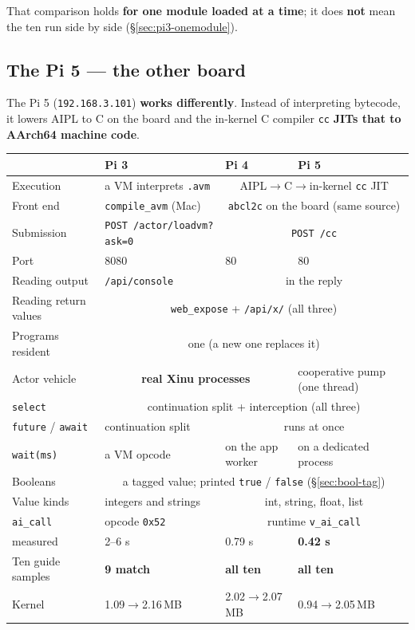 \documentclass[11pt,a4paper]{article}
\begin{document}
That comparison holds \textbf{for one module loaded at a time}; it does
\textbf{not} mean the ten run side by side (\S\ref{sec:pi3-onemodule}).

\subsection{The Pi 5 --- the other board}
\label{sec:xinu-pi5}

The Pi 5 (\texttt{192.168.3.101}) \textbf{works differently}. Instead of
interpreting bytecode, it lowers AIPL to C on the board and the in-kernel C
compiler \texttt{cc} \textbf{JITs that to AArch64 machine code}.

\begin{center}
\small
\begin{tabular}{@{}llll@{}}
\toprule
 & Pi 3 & Pi 4 & Pi 5 \\
\midrule
Execution & a VM interprets \texttt{.avm} & \multicolumn{2}{c}{AIPL$\to$C$\to$in-kernel \texttt{cc} JIT} \\
Front end & \texttt{compile\_avm} (Mac) & \multicolumn{2}{c}{\texttt{abcl2c} on the board (same source)} \\
Submission & \texttt{POST /actor/loadvm?ask=0} & \multicolumn{2}{c}{\texttt{POST /cc}} \\
Port & 8080 & 80 & 80 \\
Reading output & \texttt{/api/console} & \multicolumn{2}{c}{in the reply} \\
Reading return values & \multicolumn{3}{c}{\texttt{web\_expose} + \texttt{/api/x/} (all three)} \\
Programs resident & \multicolumn{3}{c}{one (a new one replaces it)} \\
Actor vehicle & \multicolumn{2}{c}{\textbf{real Xinu processes}} & cooperative pump (one thread) \\
\texttt{select} & \multicolumn{3}{c}{continuation split + interception (all three)} \\
\texttt{future} / \texttt{await} & continuation split & \multicolumn{2}{c}{runs at once} \quad (none concurrent) \\
\texttt{wait(ms)} & a VM opcode & on the app worker & on a dedicated process \\
Booleans & \multicolumn{3}{c}{a tagged value; printed \texttt{true} / \texttt{false} (\S\ref{sec:bool-tag})} \\
Value kinds & integers and strings & \multicolumn{2}{c}{int, string, float, list} \\
\texttt{ai\_call} & opcode \texttt{0x52} & \multicolumn{2}{c}{runtime \texttt{v\_ai\_call}} \\
\quad measured & 2--6 s & 0.79 s & \textbf{0.42 s} \\
Ten guide samples & \textbf{9 match} & \textbf{all ten} & \textbf{all ten} \\
Kernel & 1.09$\to$2.16\,MB & 2.02$\to$2.07\,MB & 0.94$\to$2.05\,MB \\
\bottomrule
\end{tabular}
\end{center}
\end{document}
